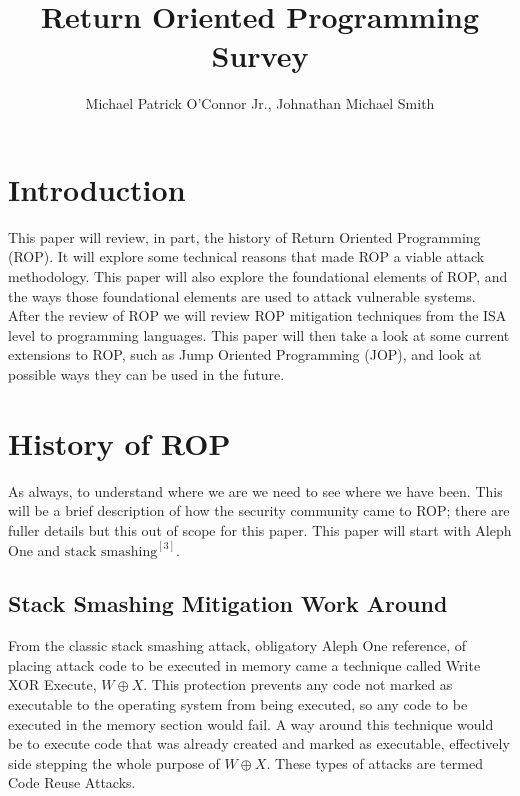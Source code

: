 \documentclass[11pt]{amsart}
\title{Return Oriented Programming Survey}
\author{Michael Patrick O'Connor Jr., Johnathan Michael Smith}
\date{}
\begin{document}
\maketitle

\newpage
\section*{Introduction}
This paper will review, in part, the history of Return Oriented Programming (ROP). It will explore some technical reasons that made ROP a viable attack methodology. This paper will also explore the foundational elements of ROP, and the ways those foundational elements are used to attack vulnerable systems. After the review of ROP we will review ROP mitigation techniques from the ISA level to programming languages. This paper will then take a look at some current extensions to ROP, such as Jump Oriented Programming (JOP), and look at possible ways they can be used in the future.
\section*{History of ROP}
As always, to understand where we are we need to see where we have been. This will be a brief description of how the security community came to ROP; there are fuller details but this out of scope for this paper. This paper will start with Aleph One and $\text{stack smashing}^{[3]}$.
\subsection*{Stack Smashing Mitigation Work Around}
From the classic stack smashing attack, obligatory Aleph One reference, of placing attack code to be executed in memory came a technique called Write XOR Execute, $W \oplus X$. This protection prevents any code not marked as executable to the operating system from being executed, so any code to be executed in the memory section would fail. A way around this technique would be to execute code that was already created and marked as executable, effectively side stepping the whole purpose of $W \oplus X$. These types of attacks are termed Code Reuse Attacks.
\end{document}
